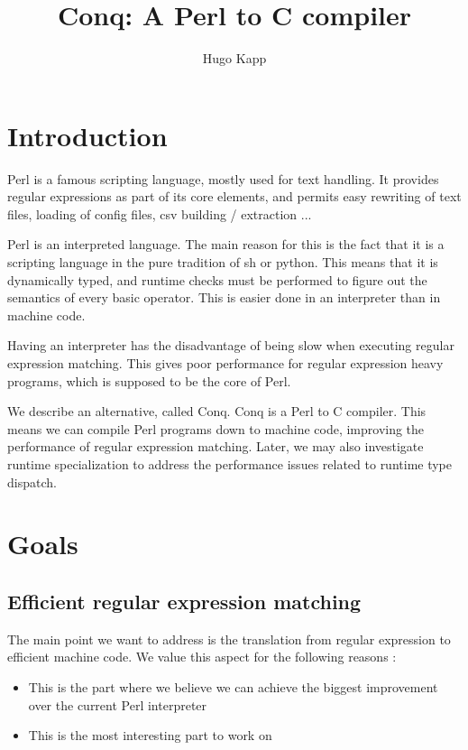 \documentclass[11pt,a4paper]{article}
\title{Conq: A Perl to C compiler}
\author{Hugo Kapp}
\newcommand{\pgl}[1]{\textsf{#1}}
\begin{document}
\maketitle


\tableofcontents

\section*{Introduction}

Perl is a famous scripting language, mostly used for text handling. It provides regular expressions as part of its core elements, and permits easy rewriting of text files, loading of config files, csv building / extraction ...

Perl is an interpreted language. The main reason for this is the fact that it is a scripting language in the pure tradition of \pgl{sh} or \pgl{python}. This means that it is dynamically typed, and runtime checks must be performed to figure out the semantics of every basic operator. This is easier done in an interpreter than in machine code.

Having an interpreter has the disadvantage of being slow when executing regular expression matching. This gives poor performance for regular expression heavy programs, which is supposed to be the core of Perl.


We describe an alternative, called Conq. Conq is a Perl to C compiler. This means we can compile Perl programs down to machine code, improving the performance of regular expression matching. Later, we may also investigate runtime specialization to address the performance issues related to runtime type dispatch.

\section{Goals}

\subsection{Efficient regular expression matching}

The main point we want to address is the translation from regular expression to efficient machine code. We value this aspect for the following reasons :
\begin{itemize}
\item This is the part where we believe we can achieve the biggest improvement over the current Perl interpreter
\item This is the most interesting part to work on
\end{itemize}
\end{document}

